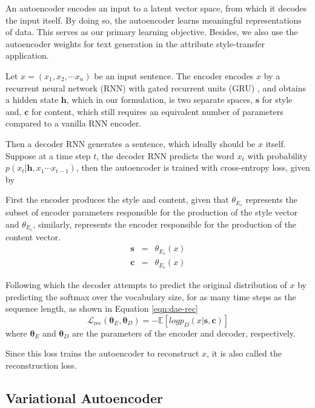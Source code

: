 An autoencoder encodes an input to a latent vector space, from which it decodes the input itself. By doing so, the autoencoder learns meaningful representations of data. This serves as our primary learning objective. Besides, we also use the autoencoder weights  for text generation in the attribute style-transfer application.

Let $x=(x_1, x_2, \cdots x_n)$ be an input sentence. The encoder encodes $x$ by a recurrent neural network (RNN) with gated recurrent units (GRU) \citep{cho2014learning}, and obtains a hidden state $\bm h$, which in our formulation, is two separate spaces, $\bm s$ for style and, $\bm c$ for content, which still requires an equivalent number of parameters compared to a vanilla RNN encoder.

Then a decoder RNN generates a sentence, which ideally should be $x$ itself. Suppose at a time step $t$, the decoder RNN predicts the word $x_t$ with probability $p(x_t | \bm h, x_1 \cdots x_{t-1})$, then the autoencoder is trained with cross-entropy loss, given by

First the encoder produces the style and content, given that $\theta_{E_s}$ represents the subset of encoder parameters responsible for the production of the style vector and $\theta_{E_c}$, similarly, represents the encoder responsible for the production of the content vector.
\begin{eqnarray*}
	\bm s &=& \theta_{E_s}(x) \nonumber \\
	\bm c &=& \theta_{E_c}(x) \nonumber
\end{eqnarray*}

Following which the decoder attempts to predict the original distribution of $x$ by predicting the softmax over the vocabulary size, for as many time steps as the sequence length, as shown in Equation \ref{eqn:dae-rec}
\begin{equation} \label{eqn:dae-rec}
	\mathcal{L}_\text{rec}(\bm\theta_E,\bm\theta_D)= -\mathbb{E}[log p_D(x|\bm s, \bm c)]
\end{equation}
where $\bm\theta_E$ and $\bm\theta_D$ are the parameters of the encoder and decoder, respectively.

Since this loss trains the autoencoder to reconstruct $x$, it is also called the reconstruction loss.


\subsection{Variational Autoencoder}

